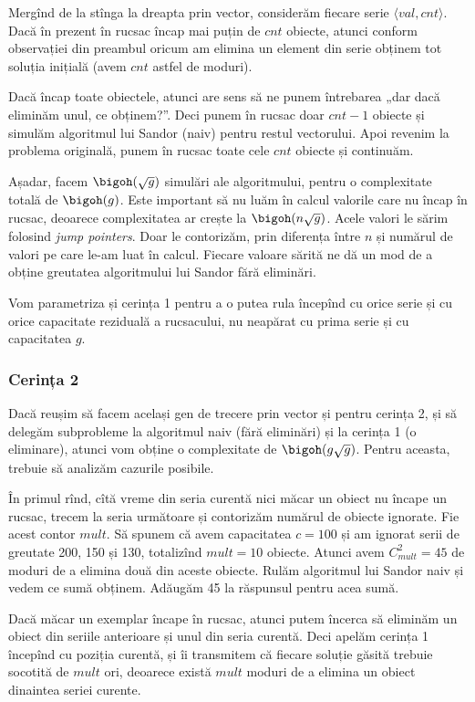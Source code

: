 Mergînd de la stînga la dreapta prin vector, considerăm fiecare serie $\langle val, cnt \rangle$. Dacă în prezent în rucsac încap mai puțin de $cnt$ obiecte, atunci conform observației din preambul oricum am elimina un element din serie obținem tot soluția inițială (avem $cnt$ astfel de moduri).

Dacă încap toate obiectele, atunci are sens să ne punem întrebarea „dar dacă eliminăm unul, ce obținem?”. Deci punem în rucsac doar $cnt-1$ obiecte și simulăm algoritmul lui Sandor (naiv) pentru restul vectorului. Apoi revenim la problema originală, punem în rucsac toate cele $cnt$ obiecte și continuăm.

Așadar, facem $\bigoh(\sqrt{g})$ simulări ale algoritmului, pentru o complexitate totală de $\bigoh(g)$. Este important să nu luăm în calcul valorile care nu încap în rucsac, deoarece complexitatea ar crește la $\bigoh(n \sqrt{g})$. Acele valori le sărim folosind \textit{jump pointers}. Doar le contorizăm, prin diferența între $n$ și numărul de valori pe care le-am luat în calcul. Fiecare valoare sărită ne dă un mod de a obține greutatea algoritmului lui Sandor fără eliminări.

Vom parametriza și cerința 1 pentru a o putea rula începînd cu orice serie și cu orice capacitate reziduală a rucsacului, nu neapărat cu prima serie și cu capacitatea $g$.

\subsubsection*{Cerința 2}

Dacă reușim să facem același gen de trecere prin vector și pentru cerința 2, și să delegăm subprobleme la algoritmul naiv (fără eliminări) și la cerința 1 (o eliminare), atunci vom obține o complexitate de $\bigoh(g \sqrt{g})$. Pentru aceasta, trebuie să analizăm cazurile posibile.

În primul rînd, cîtă vreme din seria curentă nici măcar un obiect nu încape un rucsac, trecem la seria următoare și contorizăm numărul de obiecte ignorate. Fie acest contor $mult$. Să spunem că avem capacitatea $c=100$ și am ignorat serii de greutate 200, 150 și 130, totalizînd $mult=10$ obiecte. Atunci avem $C_{mult}^2 = 45$ de moduri de a elimina două din aceste obiecte. Rulăm algoritmul lui Sandor naiv și vedem ce sumă obținem. Adăugăm 45 la răspunsul pentru acea sumă.

Dacă măcar un exemplar încape în rucsac, atunci putem încerca să eliminăm un obiect din seriile anterioare și unul din seria curentă. Deci apelăm cerința 1 începînd cu poziția curentă, și îi transmitem că fiecare soluție găsită trebuie socotită de $mult$ ori, deoarece există $mult$ moduri de a elimina un obiect dinaintea seriei curente.

